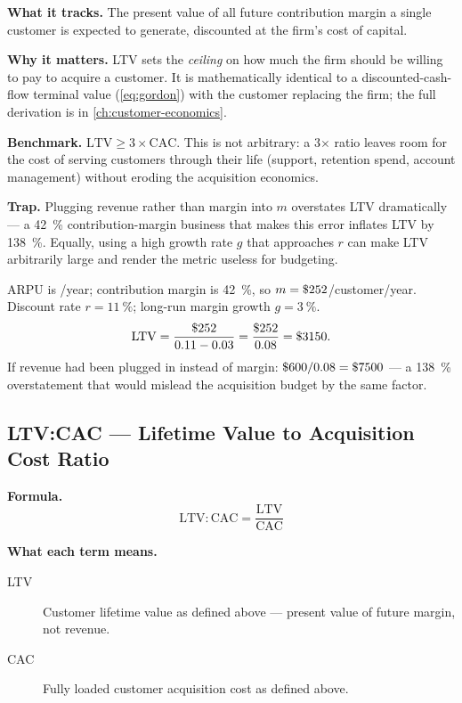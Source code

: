 \textbf{What it tracks.} The present value of all future contribution margin a single
customer is expected to generate, discounted at the firm's cost of capital.

\textbf{Why it matters.} LTV sets the \emph{ceiling} on how much the firm should be willing
to pay to acquire a customer. It is mathematically identical to a discounted-cash-flow
terminal value (\cref{eq:gordon}) with the customer replacing the firm; the full derivation
is in \cref{ch:customer-economics}.

\textbf{Benchmark.} $\mathrm{LTV} \ge 3 \times \mathrm{CAC}$. This is not arbitrary: a 3$\times$
ratio leaves room for the cost of serving customers through their life (support, retention
spend, account management) without eroding the acquisition economics.

\textbf{Trap.} Plugging revenue rather than margin into $m$ overstates LTV dramatically ---
a \qty{42}{\percent} contribution-margin business that makes this error inflates LTV by
\qty{138}{\percent}. Equally, using a high growth rate $g$ that approaches $r$ can make LTV
arbitrarily large and render the metric useless for budgeting.

\begin{example}
ARPU is /year; contribution margin is \qty{42}{\percent}, so $m =
\$\num{252}$/customer/year. Discount rate $r = \qty{11}{\percent}$; long-run margin growth
$g = \qty{3}{\percent}$.
\[
  \mathrm{LTV} = \frac{\$\num{252}}{0.11 - 0.03} = \frac{\$\num{252}}{0.08} = \$\num{3150}.
\]
If revenue had been plugged in instead of margin: $\$\num{600}/0.08 = \$\num{7500}$ --- a
\qty{138}{\percent} overstatement that would mislead the acquisition budget by the same
factor.
\end{example}


\subsection{LTV:CAC --- Lifetime Value to Acquisition Cost Ratio}

\textbf{Formula.}
\[
  \mathrm{LTV:CAC} = \frac{\mathrm{LTV}}{\mathrm{CAC}}
\]

\textbf{What each term means.}
\begin{description}
  \item[LTV] Customer lifetime value as defined above --- present value of future margin,
    not revenue.
  \item[CAC] Fully loaded customer acquisition cost as defined above.
\end{description}

